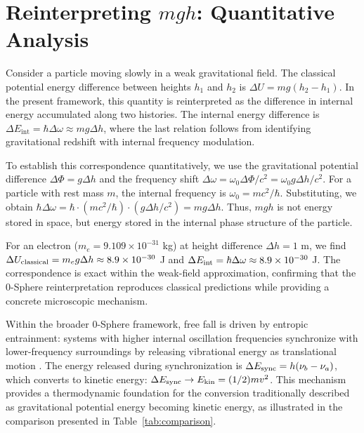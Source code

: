 \documentclass[%
 reprint,
 amsmath,amssymb,
 aps,
 prb,
]{revtex4-2}
\numberwithin{equation}{section}
\begin{document}
\section{Reinterpreting $mgh$: Quantitative Analysis}
\label{sec:mgh_reinterpret}

Consider a particle moving slowly in a weak gravitational field. The classical potential energy difference between heights $h_1$ and $h_2$ is $\Delta U = mg(h_2 - h_1)$. In the present framework, this quantity is reinterpreted as the difference in internal energy accumulated along two histories. The internal energy difference is $\Delta E_{\text{int}} = \hbar \Delta \omega \approx m g \Delta h$, where the last relation follows from identifying gravitational redshift with internal frequency modulation.

To establish this correspondence quantitatively, we use the gravitational potential difference $\Delta \Phi = g \Delta h$ and the frequency shift $\Delta \omega = \omega_0 \Delta \Phi/c^2 = \omega_0 g \Delta h/c^2$. For a particle with rest mass $m$, the internal frequency is $\omega_0 = mc^2/\hbar$. Substituting, we obtain $\hbar \Delta \omega = \hbar \cdot (mc^2/\hbar) \cdot (g \Delta h/c^2) = mg\Delta h$. Thus, $mgh$ is not energy stored in space, but energy stored in the internal phase structure of the particle.

For an electron ($m_e = 9.109 \times 10^{-31}$ kg) at height difference $\Delta h = 1$ m, we find $\Delta U_{\rm classical} = m_e g \Delta h \approx 8.9 \times 10^{-30}$ J and $\Delta E_{\rm int} = \hbar \Delta \omega \approx 8.9 \times 10^{-30}$ J. The correspondence is exact within the weak-field approximation, confirming that the 0-Sphere reinterpretation reproduces classical predictions while providing a concrete microscopic mechanism.

Within the broader 0-Sphere framework, free fall is driven by entropic entrainment: systems with higher internal oscillation frequencies synchronize with lower-frequency surroundings by releasing vibrational energy as translational motion \cite{Hanamura2026Geometrical}. The energy released during synchronization is $\Delta E_{\rm sync} = h(\nu_b - \nu_a)$, which converts to kinetic energy: $\Delta E_{\rm sync} \to E_{\rm kin} = (1/2)mv^2$. This mechanism provides a thermodynamic foundation for the conversion traditionally described as gravitational potential energy becoming kinetic energy, as illustrated in the comparison presented in Table~\ref{tab:comparison}.
\end{document}
